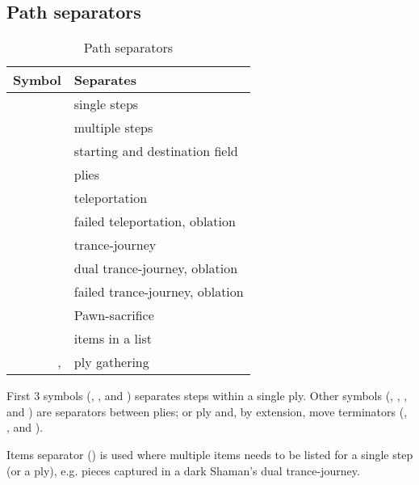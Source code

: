 \clearpage %

\subsection*{Path separators}
\label{sec:Appendix/Summary/Path separators}

\begin{table}[!h]
\centering
\begin{tabular}{ rl }
\toprule
\textbf{Symbol}      & \textbf{Separates}                         \\
\midrule
\alg{.}              & single steps                               \\
\alg{..}             & multiple steps                             \\
\alg{-}              & starting and destination field             \\ \cmidrule{1-2}
\alg{\~{}}           & plies                                      \\
\alg{|}              & teleportation                              \\
\alg{||}             & failed teleportation, oblation             \\
\alg{@}              & trance-journey                             \\
\alg{@@}             & dual trance-journey, oblation              \\
\alg{@@@}            & failed trance-journey, oblation            \\
\alg{;;}             & Pawn-sacrifice                             \\ \cmidrule{1-2}
\alg{,}              & items in a list                            \\
\alg{[}, \alg{]}     & ply gathering                              \\
\bottomrule
\end{tabular}
\caption{Path separators}
\label{tbl:Appendix/Summary/Path separators}
\end{table}

First 3 symbols (, , and \alg{-}) separates steps within a single ply.
Other symbols (\alg{\~{}}, \alg{|}, , and \alg{;;}) are separators between plies;
or ply and, by extension, move terminators (\alg{||}, , and ).

Items separator (\alg{,}) is used where multiple items needs to be listed for a single
step (or a ply), e.g. pieces captured in a dark Shaman's dual trance-journey.

